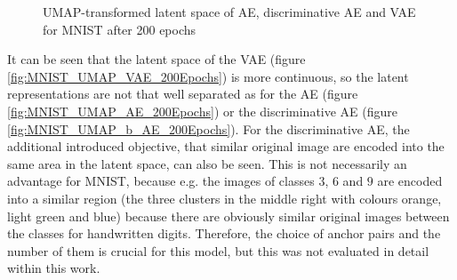 \documentclass[12pt,DIV14,BCOR12mm,a4paper,footexclude,headinclude,halfparskip-,twoside,openright,cleardoubleempty,idxtotoc,bibtotoc,listtotoc,abstracton]{scrreprt} %
\numberwithin{equation}{chapter}
\begin{document}
	 \begin{figure}[htb!]
		\centering
		\qquad
		\qquad
		\caption{UMAP-transformed latent space of AE, discriminative AE and VAE for MNIST after 200 epochs}
		\label{fig:UMAP_AE_b_AE_VAE_MNIST}
	\end{figure}
	It can be seen that the latent space of the VAE (figure \ref{fig:MNIST_UMAP_VAE_200Epochs}) is more continuous, so the latent representations are not that well separated as for the AE (figure \ref{fig:MNIST_UMAP_AE_200Epochs}) or the discriminative AE (figure \ref{fig:MNIST_UMAP_b_AE_200Epochs}). For the discriminative AE, the additional introduced objective, that similar original image are encoded into the same area in the latent space, can also be seen. This is not necessarily an advantage for MNIST, because e.g. the images of classes $3$, $6$ and $9$ are encoded into a similar region (the three clusters in the middle right with colours orange, light green and blue) because there are obviously similar original images between the classes for handwritten digits. Therefore, the choice of anchor pairs and the number of them is crucial for this model, but this was not evaluated in detail within this work.
\end{document}
